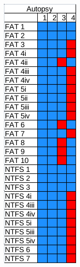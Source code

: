 \begin{figure}[h!]
    \centering

    \begin{subfigure}{0.3\linewidth}
        \includegraphics[width=\linewidth]{fig/autopsy_results.png}

\end{subfigure}
\end{figure}
